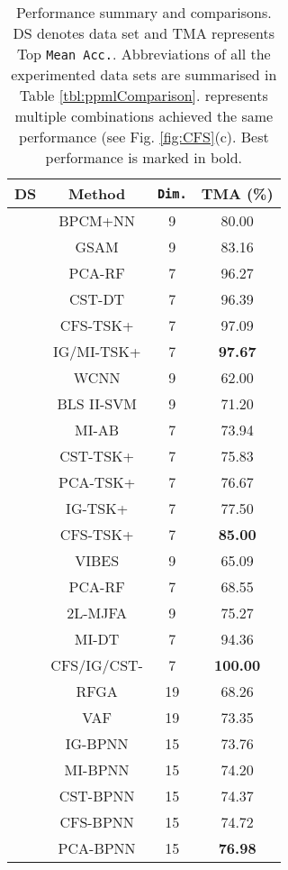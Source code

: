 \documentclass{article}
\newcommand*{\1}{\textcolor{magenta}}
\begin{document}
	








\begin{table}
	\centering
	\caption{Performance summary and comparisons. DS denotes data set and TMA represents Top \texttt{Mean Acc.}. Abbreviations of all the experimented data sets are summarised in Table \ref{tbl:ppmlComparison}.  represents multiple combinations achieved the same performance (see Fig. \ref{fig:CFS}(c). Best performance is marked in bold.}
	\begin{tabular}{c|c|c|c}
		\hline
		DS
		& Method & \texttt{Dim.} & TMA (\%)\\
		\hline
		\hline
		\multirow{6}{*}{\rotatebox{90}{CCRFDS}} & BPCM+NN \cite{li2019bayesian} & 9 & 80.00\\ 
		& GSAM \cite{lu2020machine} & 9 & 83.16\\
		& PCA-RF & 7 & 96.27\\ 
		& CST-DT & 7 & 96.39\\
		& CFS-TSK+ & 7 & 97.09\\
		& IG/MI-TSK+ & 7 & \textbf{97.67}\\
		
		\hline
		\multirow{7}{*}{\rotatebox{90}{BCCDS}} & WCNN \cite{livieris2019improving} & 9 & 62.00\\ 
		& BLS II-SVM \cite{tang2019construction} & 9 & 71.20\\
		& MI-AB & 7 & 73.94\\
		& CST-TSK+ & 7 & 75.83\\
		& PCA-TSK+ & 7 & 76.67\\
		& IG-TSK+ & 7 & 77.50\\
		& CFS-TSK+ & 7 & \textbf{85.00}\\
		
		\hline
		\multirow{5}{*}{\rotatebox{90}{BTDS}} & VIBES \cite{aydin2019construction} & 9 & 65.09\\
		& PCA-RF & 7 & 68.55\\
		& 2L-MJFA \cite{yang2018new} & 9 & 75.27\\
		& MI-DT & 7 & 94.36\\
		& CFS/IG/CST- & 7 & \textbf{100.00}\\
		
		\hline
		\multirow{7}{*}{\rotatebox{90}{DRDDS}} & RFGA \cite{elyan2017genetic} & 19 & 68.26\\
		& VAF \cite{apicella2019simple} & 19 & 73.35\\
		& IG-BPNN & 15 & 73.76\\
		& MI-BPNN & 15 & 74.20\\
		& CST-BPNN & 15 & 74.37\\
		& CFS-BPNN & 15 & 74.72\\ 
		& PCA-BPNN & 15 & \textbf{76.98}\\ 
		\hline
	\end{tabular}
	\label{tbl:csktsk+}
\end{table}
\end{document}
